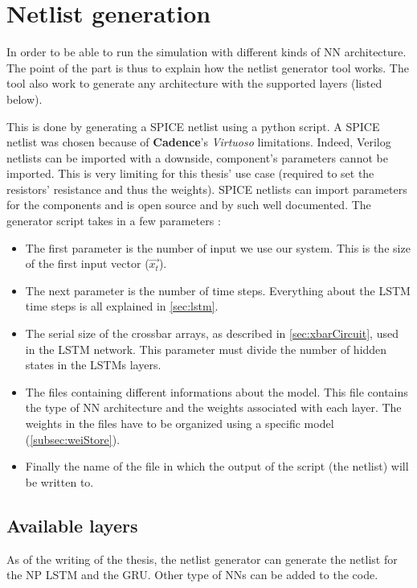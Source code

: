 \section{Netlist generation}
\label{sec:netlist}

In order to be able to run the simulation with different kinds of \ac{NN} architecture. The point of the part is thus to explain how the netlist generator tool works. The tool also work to generate any architecture with the supported layers (listed below).

This is done by generating a SPICE netlist using a python script. A SPICE netlist was chosen because of \textbf{Cadence}'s \textit{Virtuoso} limitations. Indeed, Verilog netlists can be imported with a downside, component's parameters cannot be imported. This is very limiting for this thesis' use case (required to set the resistors' resistance and thus the weights). SPICE netlists can import parameters for the components and is open source and by such well documented. The generator script takes in a few parameters :

\begin{itemize}
  \item The first parameter is the number of input we use our system. This is the size of the first input vector ($\overrightarrow{x_t}$).
  \item The next parameter is the number of time steps. Everything about the \ac{LSTM} time steps is all explained in \cref{sec:lstm}.
  \item The serial size of the crossbar arrays, as described in \cref{sec:xbarCircuit}, used in the \ac{LSTM} network. This parameter must divide the number of hidden states in the \acp{LSTM} layers.
  \item The files containing different informations about the model. This file contains the type of \ac{NN} architecture and the weights associated with each layer. The weights in the files have to be organized using a specific model (\cref{subsec:weiStore}).
  \item Finally the name of the file in which the output of the script (the netlist) will be written to.
\end{itemize}

\subsection{Available layers}

As of the writing of the thesis, the netlist generator can generate the netlist for the \ac{NP} \ac{LSTM} and the \ac{GRU}. Other type of \acp{NN} can be added to the code.

